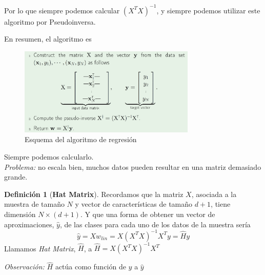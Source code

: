 \documentclass[11pt,a4paper]{article}
\theoremstyle{definition}
\newtheorem{definition}{Definición}[section]
\begin{document}
	Por lo que siempre podemos calcular $(X^TX)^{-1}$, y siempre podemos utilizar este algoritmo por Pseudoinversa.
	
	En resumen, el algoritmo es
		\begin{figure}[h!]
	\centering
	\includegraphics[width=0.75\textwidth]{images/algo_regre_b}
	\caption{Esquema del algoritmo de regresión}
	\end{figure}

	Siempre podemos calcularlo.\\
		\textit{Problema:} no escala bien, muchos datos pueden resultar en una matriz demasiado grande.\\	
		
	\begin{definition}[\textbf{Hat Matrix}]
		Recordamos que la matriz $X$, asociada a la muestra de tamaño $N$ y vector de características de tamaño $d+1$, tiene dimensión $N\times (d+1)$. Y que una forma de obtener un vector de  aproximaciones, $\hat y$, de las clases para cada uno de los datos de la muestra sería
		$$\hat y=X w_{lin}=X(X^TX)^{-1}X^Ty=\hat H y$$
		Llamamos \textit{Hat Matrix}, $\hat H$, a $\hat H=X(X^TX)^{-1}X^T$
		
	\end{definition}
	
	\textit{Observación:} $\hat H$ actúa como función de $y$ a $\hat y$
	
\end{document}
